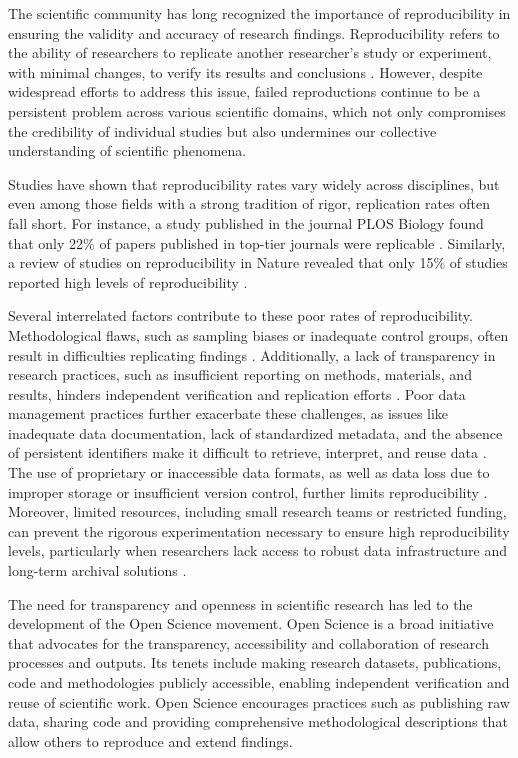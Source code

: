 \documentclass[final]{rc-book-2.14}
\begin{document}
The scientific community has long recognized the importance of reproducibility in ensuring the validity and accuracy of research findings. Reproducibility refers to the ability of researchers to replicate another researcher's study or experiment, with minimal changes, to verify its results and conclusions \cite{vasilevsky_reproducibility_2013}. However, despite widespread efforts to address this issue, failed reproductions continue to be a persistent problem across various scientific domains, which not only compromises the credibility of individual studies but also undermines our collective understanding of scientific phenomena.

Studies have shown that reproducibility rates vary widely across disciplines, but even among those fields with a strong tradition of rigor, replication rates often fall short. For instance, a study published in the journal PLOS Biology found that only 22\% of papers published in top-tier journals were replicable \cite{freedman_economics_2015}. Similarly, a review of studies on reproducibility in Nature revealed that only 15\% of studies reported high levels of reproducibility \cite{landis_call_2012}.

Several interrelated factors contribute to these poor rates of reproducibility. Methodological flaws, such as sampling biases or inadequate control groups, often result in difficulties replicating findings \cite{baker2016reproducibility}. Additionally, a lack of transparency in research practices, such as insufficient reporting on methods, materials, and results, hinders independent verification and replication efforts \cite{munafo2017manifesto}. Poor data management practices further exacerbate these challenges, as issues like inadequate data documentation, lack of standardized metadata, and the absence of persistent identifiers make it difficult to retrieve, interpret, and reuse data \cite{wilkinson2016fair}. The use of proprietary or inaccessible data formats, as well as data loss due to improper storage or insufficient version control, further limits reproducibility \cite{peng2011reproducible}. Moreover, limited resources, including small research teams or restricted funding, can prevent the rigorous experimentation necessary to ensure high reproducibility levels, particularly when researchers lack access to robust data infrastructure and long-term archival solutions \cite{stark2018before}.

The need for transparency and openness in scientific research has led to the development of the Open Science movement. Open Science is a broad initiative that advocates for the transparency, accessibility and collaboration of research processes and outputs. Its tenets include making research datasets, publications, code and methodologies publicly accessible, enabling independent verification and reuse of scientific work. Open Science encourages practices such as publishing raw data, sharing code and providing comprehensive methodological descriptions that allow others to reproduce and extend findings.
\end{document}
